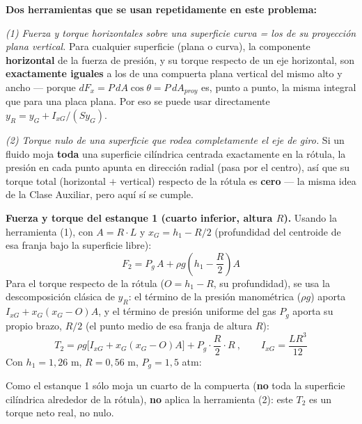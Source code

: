 \documentclass[11pt]{article}
\begin{document}
\textbf{Dos herramientas que se usan repetidamente en este problema:}

\textit{(1) Fuerza y torque horizontales sobre una superficie curva = los de su
proyecci\'on plana vertical.} Para cualquier superficie (plana o curva), la componente
\textbf{horizontal} de la fuerza de presi\'on, y su torque respecto de un eje
horizontal, son \textbf{exactamente iguales} a los de una compuerta plana vertical del
mismo alto y ancho --- porque $dF_x=P\,dA\cos\theta=P\,dA_{proy}$ es, punto a punto, la
misma integral que para una placa plana. Por eso se puede usar directamente
$y_R=y_G+I_{xG}/(Sy_G)$.

\textit{(2) Torque nulo de una superficie que rodea completamente el eje de giro.} Si
un fluido moja \textbf{toda} una superficie cil\'indrica centrada exactamente en la
r\'otula, la presi\'on en cada punto apunta en direcci\'on radial (pasa por el centro),
as\'i que su torque total (horizontal $+$ vertical) respecto de la r\'otula es
\textbf{cero} --- la misma idea de la Clase Auxiliar, pero aqu\'i s\'i se cumple.

\textbf{Fuerza y torque del estanque 1 (cuarto inferior, altura $R$).}
Usando la herramienta (1), con $A=R\cdot L$ y $x_G=h_1-R/2$ (profundidad del centroide
de esa franja bajo la superficie libre):
\begin{equation}
\boxed{F_2=P_g\,A+\rho g\left(h_1-\frac R2\right)A}
\end{equation}
Para el torque respecto de la r\'otula ($O=h_1-R$, su profundidad), se usa la
descomposici\'on cl\'asica de $y_R$: el t\'ermino de la presi\'on manom\'etrica
($\rho g$) aporta $I_{xG}+x_G(x_G-O)A$, y el t\'ermino de presi\'on uniforme del gas
$P_g$ aporta su propio brazo, $R/2$ (el punto medio de esa franja de altura $R$):
\begin{equation}
\boxed{T_2=\rho g\Big[I_{xG}+x_G(x_G-O)A\Big]+P_g\cdot\frac R2\cdot R}
\ ,\qquad I_{xG}=\frac{L R^3}{12}
\end{equation}
Con $h_1=1{,}26$ m, $R=0{,}56$ m, $P_g=1{,}5$ atm:
\begin{center}
\end{center}
Como el estanque 1 s\'olo moja un cuarto de la compuerta (\textbf{no} toda la
superficie cil\'indrica alrededor de la r\'otula), \textbf{no} aplica la herramienta
(2): este $T_2$ es un torque neto real, no nulo.
\end{document}
